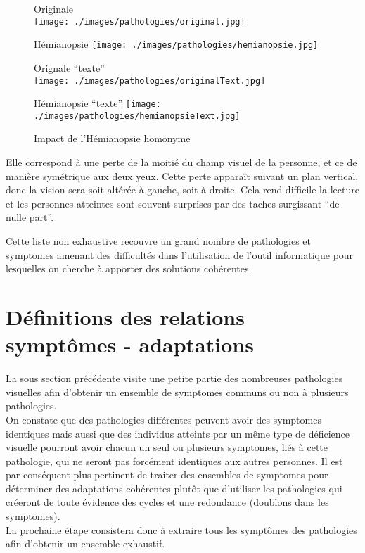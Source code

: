 \documentclass[french,a4paper]{report}
\begin{document}
{\begin{enumerate}
\begin{figure}[H]
\begin{minipage}{0.5\textwidth}
\centering
Originale \\ \vspace{0.2cm}
\texttt{[image: ./images/pathologies/original.jpg]}
\end{minipage}
\begin{minipage}{0.5\textwidth}
\centering
Hémianopsie\vspace{0.2cm}
\texttt{[image: ./images/pathologies/hemianopsie.jpg]}
\end{minipage}
\begin{minipage}{0.5\textwidth}
\centering
\vspace{0.4cm}Orignale \enquote{texte}\\ \vspace{0.1cm}
\texttt{[image: ./images/pathologies/originalText.jpg]}
\end{minipage}
\begin{minipage}{0.5\textwidth}
\centering
\vspace{0.4cm}Hémianopsie \enquote{texte}\vspace{0.1cm}
\texttt{[image: ./images/pathologies/hemianopsieText.jpg]}
\end{minipage}
\caption{Impact de l'Hémianopsie homonyme}
\end{figure}
Elle correspond à une perte de la moitié du champ visuel de la
personne, et ce de manière symétrique aux deux yeux. Cette perte
apparaît suivant un plan vertical, donc la vision sera soit altérée à
gauche, soit à droite. Cela rend difficile la lecture et les personnes
atteintes sont souvent surprises par des taches surgissant \enquote{de nulle part}.
\\
\end{enumerate}
Cette liste non exhaustive recouvre un grand nombre de pathologies et \glspl{symptome} amenant des difficultés dans l'utilisation de l'outil informatique pour lesquelles on cherche à apporter des solutions cohérentes.
\section{Définitions des relations symptômes - adaptations}
La sous section précédente visite une petite partie des nombreuses pathologies visuelles afin
d'obtenir un ensemble de \glspl{symptome} communs ou non à plusieurs pathologies.\\
On constate que des pathologies différentes peuvent avoir des \glspl{symptome} identiques mais
aussi que des individus atteints par un même type de déficience visuelle pourront avoir chacun un seul
ou plusieurs \glspl{symptome}, liés à cette pathologie, qui ne seront pas forcément identiques aux
autres personnes. Il est par conséquent plus pertinent de traiter des ensembles de
\glspl{symptome} pour déterminer des adaptations cohérentes plutôt que d'utiliser les
pathologies qui créeront de toute évidence des cycles et une redondance (doublons dans
les \glspl{symptome}).\\
La prochaine étape consistera donc à extraire tous les symptômes des pathologies afin d'obtenir un ensemble exhaustif.
}
\end{document}
